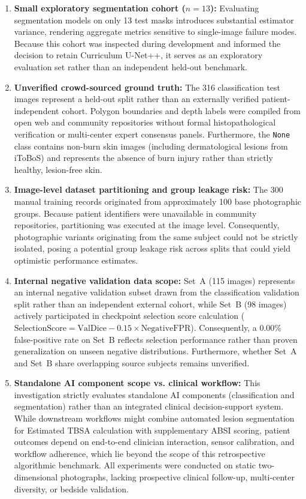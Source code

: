 \documentclass[11pt,a4paper]{article}
\begin{document}
\begin{enumerate}
  \item \textbf{Small exploratory segmentation cohort ($n = 13$):} Evaluating segmentation models on only 13 test masks introduces substantial estimator variance, rendering aggregate metrics sensitive to single-image failure modes. Because this cohort was inspected during development and informed the decision to retain Curriculum U-Net++, it serves as an exploratory evaluation set rather than an independent held-out benchmark.
  \item \textbf{Unverified crowd-sourced ground truth:} The 316 classification test images represent a held-out split rather than an externally verified patient-independent cohort. Polygon boundaries and depth labels were compiled from open web and community repositories without formal histopathological verification or multi-center expert consensus panels. Furthermore, the \texttt{None} class contains non-burn skin images (including dermatological lesions from iToBoS) and represents the absence of burn injury rather than strictly healthy, lesion-free skin.
  \item \textbf{Image-level dataset partitioning and group leakage risk:} The 300 manual training records originated from approximately 100 base photographic groups. Because patient identifiers were unavailable in community repositories, partitioning was executed at the image level. Consequently, photographic variants originating from the same subject could not be strictly isolated, posing a potential group leakage risk across splits that could yield optimistic performance estimates.
  \item \textbf{Internal negative validation data scope:} Set~A (115 images) represents an internal negative validation subset drawn from the classification validation split rather than an independent external cohort, while Set~B (98 images) actively participated in checkpoint selection score calculation ($\text{SelectionScore} = \text{ValDice} - 0.15 \times \text{NegativeFPR}$). Consequently, a 0.00\% false-positive rate on Set~B reflects selection performance rather than proven generalization on unseen negative distributions. Furthermore, whether Set~A and Set~B share overlapping source subjects remains unverified.
  \item \textbf{Standalone AI component scope vs. clinical workflow:} This investigation strictly evaluates standalone AI components (classification and segmentation) rather than an integrated clinical decision-support system. While downstream workflows might combine automated lesion segmentation for Estimated TBSA calculation with supplementary ABSI scoring, patient outcomes depend on end-to-end clinician interaction, sensor calibration, and workflow adherence, which lie beyond the scope of this retrospective algorithmic benchmark. All experiments were conducted on static two-dimensional photographs, lacking prospective clinical follow-up, multi-center diversity, or bedside validation.
\end{enumerate}
\end{document}
